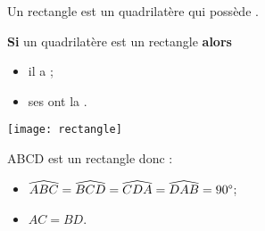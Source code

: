\begin{mydef}
	Un rectangle est un quadrilatère qui possède .
\end{mydef}

\begin{myprops}
	\textbf{Si} un quadrilatère est un rectangle \textbf{alors} 
	\begin{itemize}
		\item il a ;
		\item ses  ont la .
	\end{itemize}
\end{myprops}

\begin{myex}
	\begin{center}
		\texttt{[image: rectangle]}
	\end{center}

	ABCD est un rectangle donc :
		\begin{itemize}
			\item $\widehat{ABC} = \widehat{BCD} = \widehat{CDA} = \widehat{DAB} = 90\degree$;
			\item $AC = BD$.
		\end{itemize} 
\end{myex}